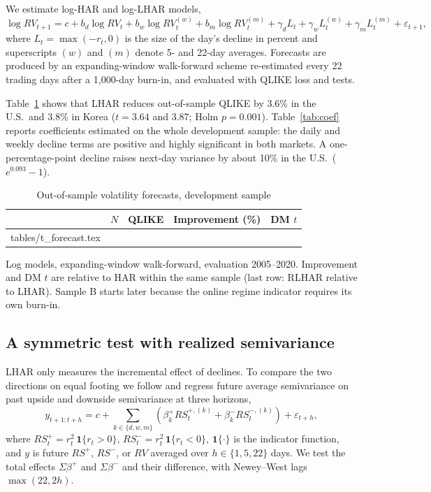\documentclass[11pt]{article}
\makeatletter
\newcommand\inputtable[1]{\@@input #1 }
\makeatother
\begin{document}
We estimate log-HAR and log-LHAR models,
\begin{equation}
\log RV_{t+1} = c + b_d \log RV_t + b_w \log RV^{(w)}_t + b_m \log RV^{(m)}_t + \gamma_d L_t + \gamma_w L^{(w)}_t + \gamma_m L^{(m)}_t + \varepsilon_{t+1},
\end{equation}
where $L_t=\max(-r_t,0)$ is the size of the day's decline in percent and superscripts $(w)$ and $(m)$ denote 5- and 22-day averages. Forecasts are produced by an expanding-window walk-forward scheme re-estimated every 22 trading days after a 1,000-day burn-in, and evaluated with QLIKE loss and \citet{dm1995} tests.

Table~\ref{tab:forecast} shows that LHAR reduces out-of-sample QLIKE by 3.6\% in the U.S.\ and 3.8\% in Korea ($t=3.64$ and $3.87$; Holm $p=0.001$). Table~\ref{tab:coef} reports coefficients estimated on the whole development sample: the daily and weekly decline terms are positive and highly significant in both markets. A one-percentage-point decline raises next-day variance by about 10\% in the U.S.\ ($e^{0.093}-1$).

\begin{table}[!htbp]
\centering
\begin{threeparttable}
\caption{Out-of-sample volatility forecasts, development sample}\label{tab:forecast}
\small
\begin{tabular}{lrrrr}
\toprule
 & $N$ & QLIKE & Improvement (\%) & DM $t$ \\
\midrule
\inputtable{tables/t_forecast.tex}
\bottomrule
\end{tabular}
\begin{tablenotes}\footnotesize
\item Log models, expanding-window walk-forward, evaluation 2005--2020. Improvement and DM $t$ are relative to HAR within the same sample (last row: RLHAR relative to LHAR). Sample B starts later because the online regime indicator requires its own burn-in. 
\end{tablenotes}
\end{threeparttable}
\end{table}

\subsection{A symmetric test with realized semivariance}

LHAR only measures the incremental effect of declines. To compare the two directions on equal footing we follow \citet{pattonsheppard2015} and regress future average semivariance on past upside and downside semivariance at three horizons,
\begin{equation}
y_{t+1:t+h} = c + \sum_{k\in\{d,w,m\}} \left(\beta^{+}_k RS^{+,(k)}_t + \beta^{-}_k RS^{-,(k)}_t\right) + \varepsilon_{t+h},
\end{equation}
where $RS^{+}_t=r_t^2\,\mathbf{1}\{r_t>0\}$, $RS^{-}_t=r_t^2\,\mathbf{1}\{r_t<0\}$, $\mathbf{1}\{\cdot\}$ is the indicator function, and $y$ is future $RS^{+}$, $RS^{-}$, or $RV$ averaged over $h\in\{1,5,22\}$ days. We test the total effects $\Sigma\beta^{+}$ and $\Sigma\beta^{-}$ and their difference, with Newey--West lags $\max(22,2h)$.
\end{document}
